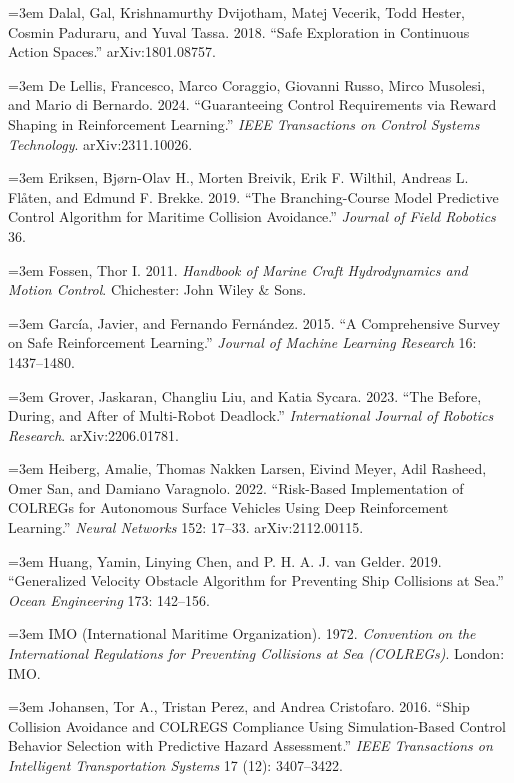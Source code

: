 \documentclass[12pt,letterpaper]{article}
\newcommand{\refitem}[1]{\par\begingroup\emergencystretch=3em\sloppy\noindent\hangindent=0.5in\hangafter=1 #1\par\endgroup}
\begin{document}
\refitem{\hypertarget{ref:dalal2018}{}Dalal, Gal, Krishnamurthy Dvijotham, Matej Vecerik, Todd Hester, Cosmin Paduraru, and Yuval Tassa. 2018. ``Safe Exploration in Continuous Action Spaces.'' arXiv:1801.08757.}

\refitem{\hypertarget{ref:de2024}{}De Lellis, Francesco, Marco Coraggio, Giovanni Russo, Mirco Musolesi, and Mario di Bernardo. 2024. ``Guaranteeing Control Requirements via Reward Shaping in Reinforcement Learning.'' \textit{IEEE Transactions on Control Systems Technology}. arXiv:2311.10026.}

\refitem{\hypertarget{ref:eriksen2019}{}Eriksen, Bjørn-Olav H., Morten Breivik, Erik F. Wilthil, Andreas L. Flåten, and Edmund F. Brekke. 2019. ``The Branching-Course Model Predictive Control Algorithm for Maritime Collision Avoidance.'' \textit{Journal of Field Robotics} 36.}

\refitem{\hypertarget{ref:fossen2011}{}Fossen, Thor I. 2011. \textit{Handbook of Marine Craft Hydrodynamics and Motion Control}. Chichester: John Wiley \& Sons.}

\refitem{\hypertarget{ref:garca2015}{}García, Javier, and Fernando Fernández. 2015. ``A Comprehensive Survey on Safe Reinforcement Learning.'' \textit{Journal of Machine Learning Research} 16: 1437--1480.}

\refitem{\hypertarget{ref:grover2023}{}Grover, Jaskaran, Changliu Liu, and Katia Sycara. 2023. ``The Before, During, and After of Multi-Robot Deadlock.'' \textit{International Journal of Robotics Research}. arXiv:2206.01781.}

\refitem{\hypertarget{ref:heiberg2022}{}Heiberg, Amalie, Thomas Nakken Larsen, Eivind Meyer, Adil Rasheed, Omer San, and Damiano Varagnolo. 2022. ``Risk-Based Implementation of COLREGs for Autonomous Surface Vehicles Using Deep Reinforcement Learning.'' \textit{Neural Networks} 152: 17--33. arXiv:2112.00115.}

\refitem{\hypertarget{ref:huang2019}{}Huang, Yamin, Linying Chen, and P. H. A. J. van Gelder. 2019. ``Generalized Velocity Obstacle Algorithm for Preventing Ship Collisions at Sea.'' \textit{Ocean Engineering} 173: 142--156.}

\refitem{\hypertarget{ref:imo1972}{}IMO (International Maritime Organization). 1972. \textit{Convention on the International Regulations for Preventing Collisions at Sea (COLREGs)}. London: IMO.}

\refitem{\hypertarget{ref:johansen2016}{}Johansen, Tor A., Tristan Perez, and Andrea Cristofaro. 2016. ``Ship Collision Avoidance and COLREGS Compliance Using Simulation-Based Control Behavior Selection with Predictive Hazard Assessment.'' \textit{IEEE Transactions on Intelligent Transportation Systems} 17 (12): 3407--3422.}
\end{document}
